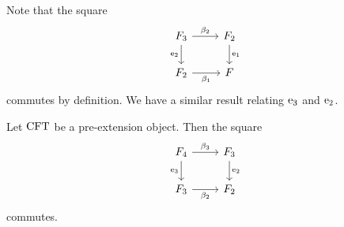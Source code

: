 Note that the square
\begin{equation*}
\begin{tikzcd}
\stesysf_3
  \ar{r}{\beta_2}
  \ar{d}[swap]{\eext{2}}
  &
\stesysf_2
  \ar{d}{\efamext}
  \\
\stesysf_2
  \ar{r}[swap]{\beta_1}
  &
\stesysf
\end{tikzcd}
\end{equation*}
commutes by definition. We have a similar result relating $\mathrm{e}_{3}$ and
$\mathrm{e}_{2}$.

\begin{lem}
Let $\mathrm{CFT}$ be a pre-extension object. Then the square
\begin{equation*}
\begin{tikzcd}
\stesysf_4
  \ar{r}{\beta_3}
  \ar{d}[swap]{\eext{3}}
  &
\stesysf_3
  \ar{d}{\eext{2}}
  \\
\stesysf_3
  \ar{r}[swap]{\beta_2}
  &
\stesysf_2
\end{tikzcd}
\end{equation*}
commutes.
\end{lem}

